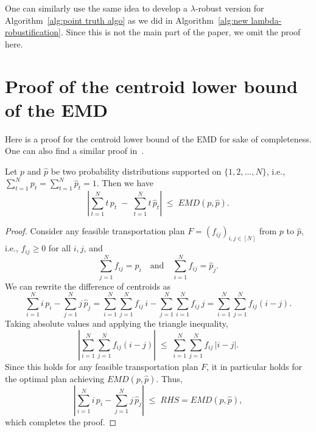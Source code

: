 One can similarly use the same idea to develop a $\lambda$-robust version for Algorithm~\ref{alg:point truth algo} as we did in Algorithm~\ref{alg:new lambda-robustification}. Since this is not the main part of the paper, we omit the proof here.


\section{Proof of the centroid lower bound of the EMD} \label{appendix:centroid_proof}

Here is a proof for the centroid lower bound of the EMD for sake of completeness. One can also find a similar proof in~\cite{centroidlowerbound}. 


\begin{thm}
\label{thm:centroid-lower-bound}
Let $p$ and $\hat p$ be two probability distributions supported on $\{1,2,\dots,N\}$, i.e., $\sum_{t=1}^N p_t = \sum_{t=1}^N \hat p_t = 1$. Then we have
\[\left| \sum_{t=1}^N t \, p_t \;-\; \sum_{t=1}^N t \, \hat p_t \right|
\;\le\;
EMD(p,\hat p).\]
\end{thm}

\begin{proof}
Consider any feasible transportation plan $F = (f_{ij})_{i,j \in [N]}$ from $p$ to $\hat p$, i.e., $f_{ij} \ge 0$ for all $i,j$, and
\[\sum_{j=1}^N f_{ij} = p_i \quad\text{and}\quad \sum_{i=1}^N f_{ij} = \hat p_j.\]
We can rewrite the difference of centroids as
\[\sum_{i=1}^N i\,p_i - \sum_{j=1}^N j\,\hat p_j= \sum_{i=1}^N \sum_{j=1}^N f_{ij}\,i - \sum_{j=1}^N \sum_{i=1}^N f_{ij}\,j= \sum_{i=1}^N \sum_{j=1}^N f_{ij}(i-j).\]
Taking absolute values and applying the triangle inequality,
\[ \left| \sum_{i=1}^N \sum_{j=1}^N f_{ij} (i - j) \right| \;\le\; \sum_{i=1}^N \sum_{j=1}^N f_{ij} \, |i - j|.\]
Since this holds for any feasible transportation plan $F$, it in particular holds for the optimal plan achieving $EMD(p,\hat p)$. Thus,
\[ \left| \sum_{i=1}^N i \, p_i - \sum_{j=1}^N j \, \hat p_j \right| \;\le\; RHS =  EMD(p,\hat p), \]
which completes the proof.
\end{proof}


